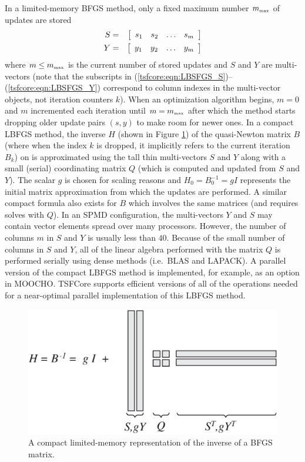 In a limited-memory BFGS method, only a fixed maximum number
$m_{\tiny\mbox{max}}$ of updates are stored
%
\begin{eqnarray}
S & = & {\bmat{cccc} s_1 & s_2 & \ldots & s_{m} \emat} \label{tsfcore:eqn:LBSFGS_S}\\
Y & = & {\bmat{cccc} y_1 & y_2 & \ldots & y_{m} \emat} \label{tsfcore:eqn:LBSFGS_Y}
\end{eqnarray}
%
where $m \le m_{\tiny\mbox{max}}$ is the current number of stored
updates and $S$ and $Y$ are multi-vectors (note that the subscripts in
(\ref{tsfcore:eqn:LBSFGS_S})--(\ref{tsfcore:eqn:LBSFGS_Y}) correspond
to column indexes in the multi-vector objects, not iteration counters
$k$).  When an optimization algorithm begins, $m=0$ and $m$
incremented each iteration until $m = m_{\tiny\mbox{max}}$ after which
the method starts dropping older update pairs $(s,y)$ to make room for
newer ones.  In a compact LBFGS method, the inverse $H$ (shown in
Figure {}\ref{tsfcore:fig:LBFGS}) of the quasi-Newton matrix $B$
(where when the index $k$ is dropped, it implicitly refers to the
current iteration $B_k$) on is approximated using the tall thin
multi-vectors $S$ and $Y$ along with a small (serial) coordinating
matrix $Q$ (which is computed and updated from $S$ and $Y$).  The
scalar $g$ is chosen for scaling reasons and $H_0 = B_0^{-1} = g I$
represents the initial matrix approximation from which the updates are
performed.  A similar compact formula also exists for $B$ which
involves the same matrices (and requires solves with $Q$).  In an SPMD
configuration, the multi-vectors $Y$ and $S$ may contain vector
elements spread over many processors.  However, the number of columns
$m$ in $S$ and $Y$ is usually less than $40$.  Because of the small
number of columns in $S$ and $Y$, all of the linear algebra performed
with the matrix $Q$ is performed serially using dense methods
(i.e.~BLAS and LAPACK).  A parallel version of the compact LBFGS
method is implemented, for example, as an option in MOOCHO.  TSFCore
supports efficient versions of all of the operations needed for a
near-optimal parallel implementation of this LBFGS method.

{\bsinglespace
\begin{figure}[t]
\begin{center}
\includegraphics*[bb= 0.0in 0.0in 7.0in 3.7in,angle=0,scale=0.60
]{LBFGS}
\end{center}
\caption{
\label{tsfcore:fig:LBFGS}
A compact limited-memory representation of the inverse of a BFGS matrix.
}
\end{figure}
\esinglespace}

